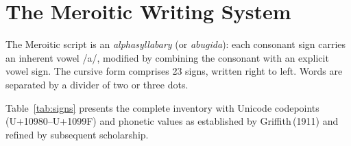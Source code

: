 \documentclass[11pt,a4paper]{article}
\begin{document}
\section{The Meroitic Writing System}

The Meroitic script is an \textit{alphasyllabary} (or \textit{abugida}): each
consonant sign carries an inherent vowel /a/, modified by combining the
consonant with an explicit vowel sign. The cursive form comprises 23 signs,
written right to left. Words are separated by a divider of two or three dots.

Table~\ref{tab:signs} presents the complete inventory with Unicode codepoints
(U+10980--U+1099F) and phonetic values as established by Griffith\,(1911) and
refined by subsequent scholarship.
\end{document}
